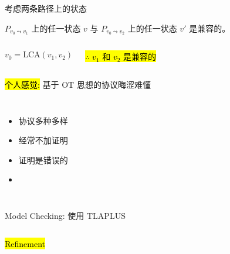 \begin{frame}{}
  \centerline{ 考虑两条路径上的状态}

  \begin{clemma}
    $P_{v_0 \leadsto v_1}$ 上的任一状态 $v$ 与 $P_{v_0 \leadsto v_2}$ 上的任一状态 $v'$ 是兼容的。
  \end{clemma}

  \begin{columns}
	\[
	  v_0 = \text{LCA}(v_1, v_2)
	\]

	\pause
	\vspace{0.50cm}
	\begin{center}
	  \hl{$\therefore$ $v_1$ 和 $v_2$ 是兼容的}
	\end{center}
  \end{columns}
\end{frame}

\begin{frame}{}
  \centerline{\large \hl{个人感觉:} 基于 OT 思想的协议晦涩难懂}

  \vspace{0.60cm}
  \begin{columns}
      \pause
      \begin{itemize}
	\setlength{\itemsep}{10pt}
	\centering
	\item 协议多种多样
	\item 经常不加证明
	\item 证明是错误的
	\item<3-> \hl{}
      \end{itemize}
  \end{columns}
\end{frame}

\begin{frame}{}
  \centerline{\large Model Checking: 使用 TLAPLUS}

  \begin{columns}
      
      \centerline{\hl{Refinement}}
  \end{columns}
\end{frame}
